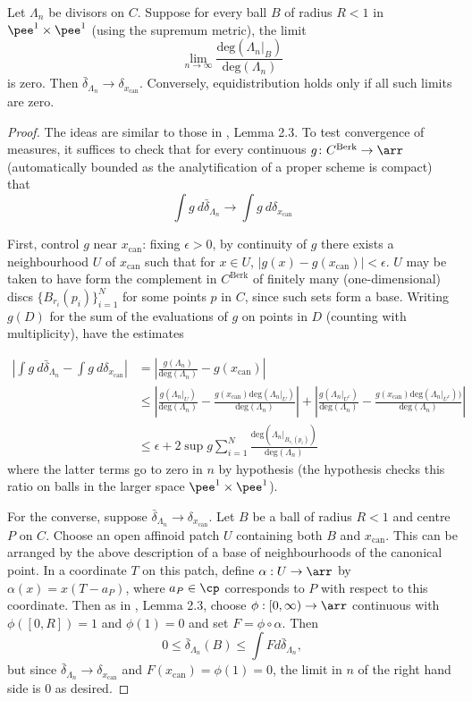 \documentclass[12pt,letterpaper]{article}
\begin{document}
	\begin{lemma} \label{padicconditionproof}
		Let $\Lambda_n$ be divisors on $C$. Suppose for every ball $B$ of radius $R<1$ in $\pee^1\times \pee^1$ (using the supremum metric), the limit 
		\[\lim_{n\to \infty} \frac{\text{deg}(\Lambda_n|_B)}{\text{deg}(\Lambda_n)}\]
		is zero. Then $\bar{\delta}_{\Lambda_n}\to \delta_{x_\text{can}}$. Conversely, equidistribution holds only if all such limits are zero.
	\end{lemma}
	
	\begin{proof}
		The ideas are similar to those in \cite{HMR20}, Lemma 2.3. To test convergence of measures, it suffices to check that for every continuous $g\colon C^\text{Berk}\to \arr$ (automatically bounded as the analytification of a proper scheme is compact) that 
		\[\int g\ d\bar{\delta}_{\Lambda_n}\to \int g\ d\delta_{x_\text{can}}\]
		
		First, control $g$ near $x_\text{can}$: fixing $\epsilon>0$, by continuity of $g$ there exists a neighbourhood $U$ of $x_\text{can}$ such that for $x\in U$, $|g(x)-g(x_\text{can})|<\epsilon$. $U$ may be taken to have form the complement in $C^\text{Berk}$ of finitely many (one-dimensional) discs $\{B_{r_i}(p_i)\}_{i=1}^N$ for some points $p$ in $C$, since such sets form a base. Writing $g(D)$ for the sum of the evaluations of $g$ on points in $D$ (counting with multiplicity), have the estimates	
		
		\begin{align*}
			\left|\int g\ d\bar{\delta}_{\Lambda_n}- \int g\ d\delta_{x_\text{can}}\right| &= \left|\frac{g(\Lambda_n)}{\text{deg}(\Lambda_n)} - g(x_\text{can})\right| \\
			&\leq \left|\frac{g(\Lambda_n|_U)}{\text{deg}(\Lambda_n)} - \frac{g(x_\text{can})\text{deg}(\Lambda_n|_U)}{\text{deg}(\Lambda_n)}\right| + \left|\frac{g(\Lambda_n|_{U^c})}{\text{deg}(\Lambda_n)} - \frac{g(x_\text{can})\text{deg}(\Lambda_n|_{U^c}))}{\text{deg}(\Lambda_n)}\right|		\\
			&\leq \epsilon + 2\sup{g} \sum_{i=1}^N\frac{\text{deg}(\Lambda_n|_{B_{r_i}(p_i)})}{\text{deg}(\Lambda_n)}
		\end{align*}
		where the latter terms go to zero in $n$ by hypothesis (the hypothesis checks this ratio on balls in the larger space $\pee^1\times\pee^1$).
		
		For the converse, suppose $\bar{\delta}_{\Lambda_n}\to\delta_{x_\text{can}}$. Let $B$ be a ball of radius $R<1$ and centre $P$ on $C$. Choose an open affinoid patch $U$ containing both $B$ and $x_\text{can}$. This can be arranged by the above description of a base of neighbourhoods of the canonical point. In a coordinate $T$ on this patch, define $\alpha: U \to \arr$ by $\alpha(x) = x(T-a_P)$, where $a_P\in \cp$ corresponds to $P$ with respect to this coordinate. Then as in \cite{HMR20}, Lemma 2.3, choose $\phi:[0,\infty)\to \arr$ continuous with $\phi([0,R])=1$ and $\phi(1)=0$ and set $F=\phi\circ\alpha$. Then \[0\leq \bar{\delta}_{\Lambda_n}(B)\leq \int F d\bar{\delta}_{\Lambda_n},\] but since $\bar{\delta}_{\Lambda_n}\to\delta_{x_\text{can}}$ and $F(x_\text{can})=\phi(1)=0$, the limit in $n$ of the right hand side is 0 as desired.
	\end{proof}
	
\end{document}
